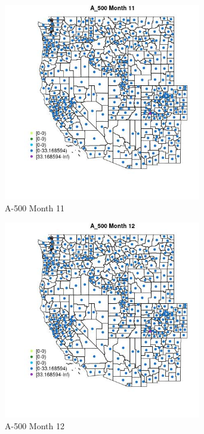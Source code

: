 \begin{figure} 
\centering  
\includegraphics[width=0.77\textwidth]{Code_Outputs/df_report_ML_predictors_CountyCentroid_Locations_Dates_2008-01-01to2018-12-31_MapObsMo11A_500.jpg} 
\caption{\label{fig:df_report_ML_predictors_CountyCentroid_Locations_Dates_2008-01-01to2018-12-31MapObsMo11A_500}A-500 Month 11} 
\end{figure} 
 

\begin{figure} 
\centering  
\includegraphics[width=0.77\textwidth]{Code_Outputs/df_report_ML_predictors_CountyCentroid_Locations_Dates_2008-01-01to2018-12-31_MapObsMo12A_500.jpg} 
\caption{\label{fig:df_report_ML_predictors_CountyCentroid_Locations_Dates_2008-01-01to2018-12-31MapObsMo12A_500}A-500 Month 12} 
\end{figure} 
 

